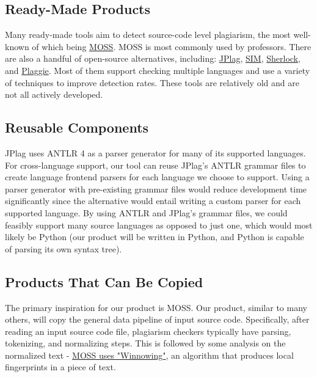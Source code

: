 \documentclass[12pt]{article}
\begin{document}
\subsection{Ready-Made Products}

Many ready-made tools aim to detect source-code level plagiarism, the most well-known of which being \href{https://theory.stanford.edu/~aiken/moss/}{MOSS}. MOSS is most commonly used by professors.
There are also a handful of open-source alternatives, including: \href{https://github.com/jplag/JPlag}{JPlag}, \href{https://dickgrune.com/Programs/similarity_tester/}{SIM}, \href{https://warwick.ac.uk/fac/sci/dcs/research/ias/software/sherlock/}{Sherlock}, and \href{https://www.cs.hut.fi/Software/Plaggie/}{Plaggie}.
Most of them support checking multiple languages and use a variety of techniques to improve detection rates. These tools are relatively old and are not all actively developed.

\subsection{Reusable Components}

JPlag uses ANTLR 4 as a parser generator for many of its supported languages. For cross-language support, our tool can reuse JPlag's ANTLR grammar files to create language frontend parsers for each language we choose to support. Using a parser generator with pre-existing grammar files would reduce development time significantly since the alternative would entail writing a custom parser for each supported language. By using ANTLR and JPlag's grammar files, we could feasibly support many source languages as opposed to just one, which would most likely be Python (our product will be written in Python, and Python is capable of parsing its own syntax tree).

\subsection{Products That Can Be Copied}

The primary inspiration for our product is MOSS. Our product, similar to many others, will copy the general data pipeline of input source code. Specifically, after reading an input source code file, plagiarism checkers typically have parsing, tokenizing, and normalizing steps. This is followed by some analysis on the normalized text - \href{https://theory.stanford.edu/~aiken/publications/papers/sigmod03.pdf}{MOSS uses "Winnowing"}, an algorithm that produces local fingerprints in a piece of text.
\end{document}
